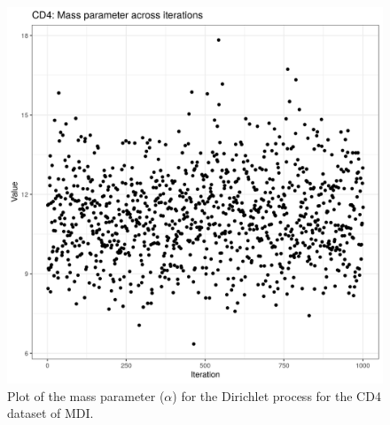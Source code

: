 \documentclass[12pt]{article} %
\begin{document}
	\newpage
	
	\begin{figure}[h]
		\centering
		\includegraphics[scale=0.75]{Images/Biology_data/Set_250/All_datasets/Mass_parameter_plots/CD4.png}
		\caption{Plot of the mass parameter ($\alpha$) for the Dirichlet process for the CD4 dataset of MDI.}
		\label{fig:results:cedar_1:mdi_cd4_mass_parameter_plot}
	\end{figure}
	
	\newpage
	
\end{document}
